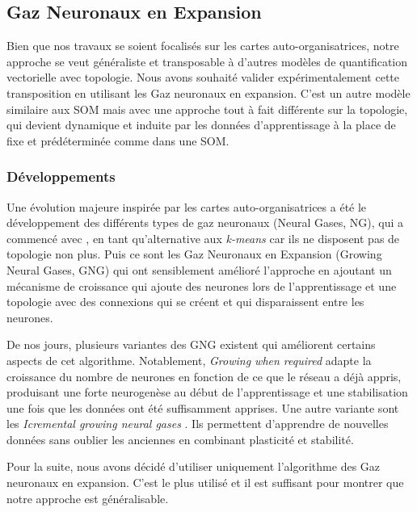 	\subsection{Gaz Neuronaux en Expansion}\label{sec:sota:gng}

	Bien que nos travaux se soient focalisés sur les cartes auto-organisatrices, notre approche se veut généraliste et transposable à d'autres modèles de quantification vectorielle avec topologie. Nous avons souhaité valider expérimentalement cette transposition en utilisant les Gaz neuronaux en expansion. C'est un autre modèle similaire aux SOM mais avec une approche tout à fait différente sur la topologie, qui devient dynamique et induite par les données d'apprentissage à la place de fixe et prédéterminée comme dans une SOM. 

	\subsubsection{Développements}

	Une évolution majeure inspirée par les cartes auto-organisatrices a été le développement des différents types de gaz neuronaux (Neural Gases, NG), qui a commencé avec \cite{martinetz1991neural}, en tant qu'alternative aux \textit{k-means} car ils ne disposent pas de topologie non plus. Puis ce sont les Gaz Neuronaux en Expansion (Growing Neural Gases, GNG) \cite{fritzke1995growing} qui ont sensiblement amélioré l'approche en ajoutant un mécanisme de croissance qui ajoute des neurones lors de l'apprentissage et une topologie avec des connexions qui se créent et qui disparaissent entre les neurones.

	De nos jours, plusieurs variantes des GNG existent qui améliorent certains aspects de cet algorithme. Notablement, \textit{Growing when required} \cite{marsland2002self} adapte la croissance du nombre de neurones en fonction de ce que le réseau a déjà appris, produisant une forte neurogenèse au début de l'apprentissage et une stabilisation une fois que les données ont été suffisamment apprises. Une autre variante sont les \textit{Icremental growing neural gases} \cite{prudent2005incremental}. Ils permettent d'apprendre de nouvelles données sans oublier les anciennes en combinant plasticité et stabilité.

	Pour la suite, nous avons décidé d'utiliser uniquement l'algorithme des Gaz neuronaux en expansion. C'est le plus utilisé et il est suffisant pour montrer que notre approche est généralisable.

